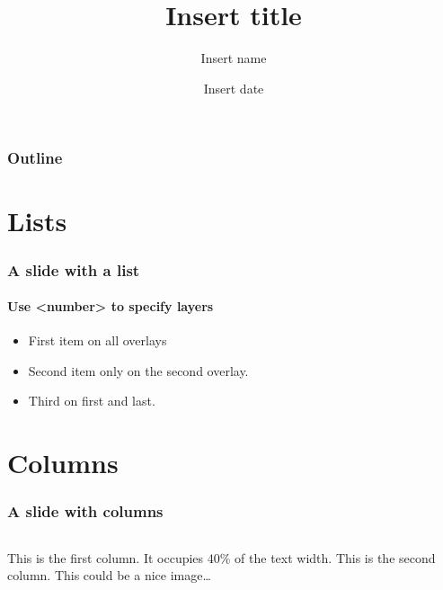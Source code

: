 \documentclass[presentation]{beamer}   %
\begin{document}
\author{Insert name}
\title{Insert title}
\date{Insert date}


\begin{frame}
  \maketitle
\end{frame}

\begin{frame}
  \frametitle{Outline}
  \tableofcontents
\end{frame}

\section{Lists}
\begin{frame}[fragile]
  \frametitle{A slide with a list}
  \framesubtitle{Use <number> to specify layers}
  \begin{itemize}
    \item<1-> First item on all overlays
    \item<2>  Second item only on the second overlay.
    \item<1,3> Third on first and last.
  \end{itemize}
  
\end{frame}

\section{Columns}
\begin{frame}
  \frametitle{A slide with columns}
  \begin{columns}[t] %
      This is the \alert{first} column. It occupies $40$\% of the text width.
      This is the \alert{second} column. This could be a nice image\ldots
      \begin{center}
        \rule{0.4\textwidth}{0.3\textwidth}
      \end{center}
  \end{columns}
\end{frame}
\end{document}
